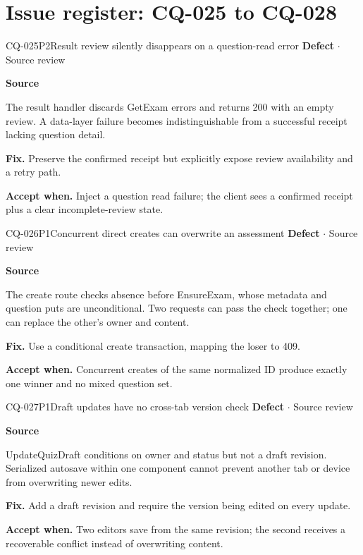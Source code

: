 \section*{Issue register: CQ-025 to CQ-028}
\begin{finding}{CQ-025}{P2}{Result review silently disappears on a question-read error}
\textbf{Defect} $\cdot$ Source review\par
\textbf{Source}\quad{}\par
The result handler discards GetExam errors and returns 200 with an empty review. A data-layer failure becomes indistinguishable from a successful receipt lacking question detail.\par
\textbf{Fix.} Preserve the confirmed receipt but explicitly expose review availability and a retry path.\par
\textbf{Accept when.} Inject a question read failure; the client sees a confirmed receipt plus a clear incomplete-review state.
\end{finding}
\begin{finding}{CQ-026}{P1}{Concurrent direct creates can overwrite an assessment}
\textbf{Defect} $\cdot$ Source review\par
\textbf{Source}\quad{}\par
The create route checks absence before EnsureExam, whose metadata and question puts are unconditional. Two requests can pass the check together; one can replace the other's owner and content.\par
\textbf{Fix.} Use a conditional create transaction, mapping the loser to 409.\par
\textbf{Accept when.} Concurrent creates of the same normalized ID produce exactly one winner and no mixed question set.
\end{finding}
\begin{finding}{CQ-027}{P1}{Draft updates have no cross-tab version check}
\textbf{Defect} $\cdot$ Source review\par
\textbf{Source}\quad{}\par
UpdateQuizDraft conditions on owner and status but not a draft revision. Serialized autosave within one component cannot prevent another tab or device from overwriting newer edits.\par
\textbf{Fix.} Add a draft revision and require the version being edited on every update.\par
\textbf{Accept when.} Two editors save from the same revision; the second receives a recoverable conflict instead of overwriting content.
\end{finding}
